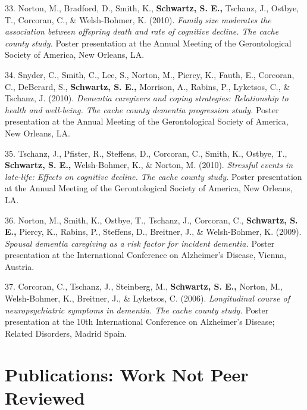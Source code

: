 \documentclass[11pt,a4paper,]{moderncv}
\newlength{\cslhangindent}
\newenvironment{CSLReferences}[2] %
 {\begin{list}{}{%
  \setlength{\itemindent}{0pt}
  \setlength{\leftmargin}{0pt}
  \setlength{\parsep}{0pt}
  \ifodd #1
   \setlength{\leftmargin}{\cslhangindent}
   \setlength{\itemindent}{-1\cslhangindent}
  \fi
  \setlength{\itemsep}{#2\baselineskip}}}
 {\end{list}}
\begin{document}
\begin{CSLReferences}{1}{0}
33. Norton, M., Bradford, D., Smith, K., \textbf{Schwartz, S. E.,}
Tschanz, J., Ostbye, T., Corcoran, C., \& Welsh-Bohmer, K. (2010).
\emph{Family size moderates the association between offspring death and
rate of cognitive decline. The cache county study.} Poster presentation
at the Annual Meeting of the Gerontological Society of America, New
Orleans, LA.

34. Snyder, C., Smith, C., Lee, S., Norton, M., Piercy, K., Fauth, E.,
Corcoran, C., DeBerard, S., \textbf{Schwartz, S. E.,} Morrison, A.,
Rabins, P., Lyketsos, C., \& Tschanz, J. (2010). \emph{Dementia
caregivers and coping strategies: Relationship to health and well-being.
The cache county dementia progression study.} Poster presentation at the
Annual Meeting of the Gerontological Society of America, New Orleans,
LA.

35. Tschanz, J., Pfister, R., Steffens, D., Corcoran, C., Smith, K.,
Ostbye, T., \textbf{Schwartz, S. E.,} Welsh-Bohmer, K., \& Norton, M.
(2010). \emph{Stressful events in late-life: Effects on cognitive
decline. The cache county study.} Poster presentation at the Annual
Meeting of the Gerontological Society of America, New Orleans, LA.

36. Norton, M., Smith, K., Ostbye, T., Tschanz, J., Corcoran, C.,
\textbf{Schwartz, S. E.,} Piercy, K., Rabins, P., Steffens, D.,
Breitner, J., \& Welsh-Bohmer, K. (2009). \emph{Spousal dementia
caregiving as a risk factor for incident dementia.} Poster presentation
at the International Conference on Alzheimer's Disease, Vienna, Austria.

37. Corcoran, C., Tschanz, J., Steinberg, M., \textbf{Schwartz, S. E.,}
Norton, M., Welsh-Bohmer, K., Breitner, J., \& Lyketsos, C. (2006).
\emph{Longitudinal course of neuropsychiatric symptoms in dementia. The
cache county study.} Poster presentation at the 10th International
Conference on Alzheimer's Disease; Related Disorders, Madrid Spain.

\end{CSLReferences}

\endgroup

\vspace{7mm}

\section{Publications: Work Not Peer
Reviewed}\label{publications-work-not-peer-reviewed}
\end{document}
